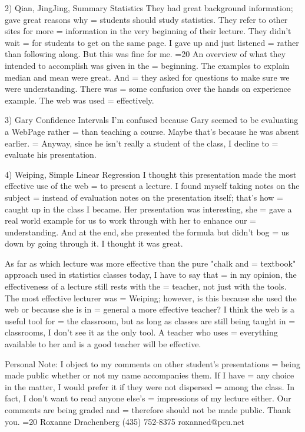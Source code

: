 2)  Qian, JingJing, Summary Statistics
    They had great background information; gave great reasons why =
students should study statistics.  They refer to other sites for more =
information in the very beginning of their lecture.  They didn't wait =
for students to get on the same page.  I gave up and just listened =
rather than following along.  But this was fine for me. =20
    An overview of what they intended to accomplish was given in the =
beginning.  The examples to explain median and mean were great.  And =
they asked for questions to make sure we were understanding.  There was =
some confusion over the hands on experience example.  The web was used =
effectively.

3) Gary  Confidence Intervals
    I'm confused because Gary seemed to be evaluating a WebPage rather =
than teaching a course.  Maybe that's because he was absent earlier.  =
Anyway, since he isn't really a student of the class, I decline to =
evaluate his presentation.

4)  Weiping, Simple Linear Regression
    I thought this presentation made the most effective use of the web =
to present a lecture.  I found myself taking notes on the subject =
instead of evaluation notes on the presentation itself; that's how =
caught up in the class I became.  Her presentation was interesting, she =
gave a real world example for us to work through with her to enhance our =
understanding.  And at the end, she presented the formula but didn't bog =
us down by going through it.  I thought it was great.

    As far as which lecture was more effective than the pure "chalk and =
textbook" approach used in statistics classes today, I have to say that =
in my opinion, the effectiveness of a lecture still rests with the =
teacher, not just with the tools.  The most effective lecturer was =
Weiping; however, is this because she used the web or because she is in =
general a more effective teacher?  I think the web is a useful tool for =
the classroom, but as long as classes are still being taught in =
classrooms, I don't see it as the only tool.  A teacher who uses =
everything available to her and is a good teacher will be effective.

Personal Note:  I object to my comments on other student's presentations =
being made public whether or not my name accompanies them.  If I have =
any choice in the matter, I would prefer it if they were not dispersed =
among the class.  In fact, I don't want to read anyone else's =
impressions of my lecture either. Our comments are being graded and =
therefore should not be made public.  Thank you.
=20
Roxanne Drachenberg
(435) 752-8375
roxanned@pcu.net

